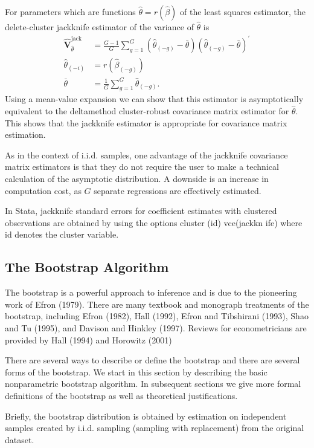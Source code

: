 \documentclass[10pt]{article}
\begin{document}
For parameters which are functions $\widehat{\theta}=r(\widehat{\beta})$ of the least squares estimator, the delete-cluster jackknife estimator of the variance of $\widehat{\theta}$ is
$$
\begin{aligned}
\widehat{\boldsymbol{V}}_{\widehat{\theta}}^{\text {jack }} &=\frac{G-1}{G} \sum_{g=1}^{G}\left(\widehat{\theta}_{(-g)}-\bar{\theta}\right)\left(\widehat{\theta}_{(-g)}-\bar{\theta}\right)^{\prime} \\
\widehat{\theta}_{(-i)} &=r\left(\widehat{\beta}_{(-g)}\right) \\
\bar{\theta} &=\frac{1}{G} \sum_{g=1}^{G} \widehat{\theta}_{(-g)} .
\end{aligned}
$$
Using a mean-value expansion we can show that this estimator is asymptotically equivalent to the deltamethod cluster-robust covariance matrix estimator for $\widehat{\theta}$. This shows that the jackknife estimator is appropriate for covariance matrix estimation.

As in the context of i.i.d. samples, one advantage of the jackknife covariance matrix estimators is that they do not require the user to make a technical calculation of the asymptotic distribution. A downside is an increase in computation cost, as $G$ separate regressions are effectively estimated.

In Stata, jackknife standard errors for coefficient estimates with clustered observations are obtained by using the options cluster (id) vce(jackkn ife) where id denotes the cluster variable.

\subsection{The Bootstrap Algorithm}
The bootstrap is a powerful approach to inference and is due to the pioneering work of Efron (1979). There are many textbook and monograph treatments of the bootstrap, including Efron (1982), Hall (1992), Efron and Tibshirani (1993), Shao and Tu (1995), and Davison and Hinkley (1997). Reviews for econometricians are provided by Hall (1994) and Horowitz (2001)

There are several ways to describe or define the bootstrap and there are several forms of the bootstrap. We start in this section by describing the basic nonparametric bootstrap algorithm. In subsequent sections we give more formal definitions of the bootstrap as well as theoretical justifications.

Briefly, the bootstrap distribution is obtained by estimation on independent samples created by i.i.d. sampling (sampling with replacement) from the original dataset.
\end{document}
